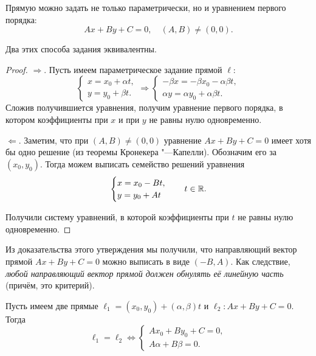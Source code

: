 Прямую можно задать не только параметрически, но и уравнением первого порядка:
$$
Ax + By + C = 0,\quad(A, B) \ne (0, 0).
$$

\begin{theorem}
    Два этих способа задания эквивалентны.
\end{theorem}

\begin{proof}
    $\Rightarrow$. Пусть имеем параметрическое задание прямой $\ell$:
    $$
    \begin{cases}
        x = x_0 + \alpha t,\\
        y = y_0 + \beta t.
    \end{cases} \Rightarrow 
    \begin{cases}
        -\beta x = -\beta x_0 -\alpha\beta t,\\
        \alpha y = \alpha y_0 + \alpha\beta t.
    \end{cases}
    $$
    Сложив получившиется уравнения, получим уравнение первого порядка, в котором коэффициенты при $x$ и при $y$ не равны нулю одновременно.

    $\Leftarrow$. Заметим, что при $(A, B) \ne (0, 0)$ уравнение $Ax + By + C = 0$ имеет хотя бы одно решение (из теоремы Кронекера "---Капелли). Обозначим его за $(x_0, y_0)$. Тогда можем выписать семейство решений уравнения
    $$
    \begin{cases}
        x = x_0 - Bt,\\
        y = y_0 + At
    \end{cases}\quad t \in \mathbb{R}.
    $$

    Получили систему уравнений, в которой коэффициенты при $t$ не равны нулю одновременно.
\end{proof}

\begin{orangebox}
    Из доказательства этого утверждения мы получили, что направляющий вектор прямой $Ax + By + C = 0$ можно выписать в виде $(-B, A)$. Как следствие, \textit{любой направляющий вектор прямой должен обнулять её линейную часть} (причём, это критерий).
\end{orangebox}

\begin{statement}
    Пусть имеем две прямые $\ell_1 = (x_0, y_0) + (\alpha, \beta)t$ и $\ell_2: Ax + By + C = 0$. Тогда
    $$
    \ell_1 = \ell_2 \Leftrightarrow
    \begin{cases}
        Ax_0 + By_0 + C = 0,\\
        A\alpha + B\beta = 0.
    \end{cases}
    $$
\end{statement}

